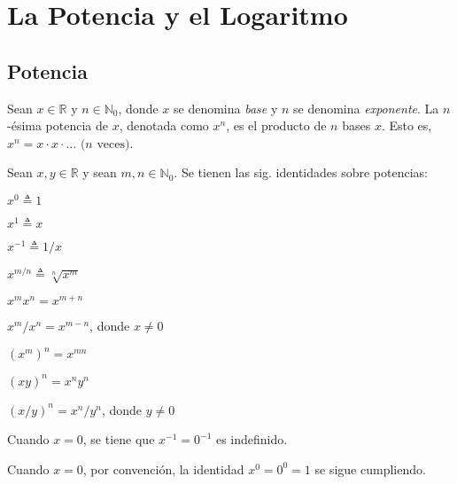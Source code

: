 \chapter{La Potencia y el Logaritmo}

\section{Potencia}

Sean $x\in\mathbb{R}$ y $n\in\mathbb{N}_{0}$, donde $x$ se denomina
\emph{base} y $n$ se denomina \emph{exponente}. La $n$-ésima potencia\emph{
}de $x$, denotada como $x^{n}$, es el producto de $n$ bases $x$.
Esto es, $x^{n}=x\cdot x\cdot\dots\text{ (}n\text{ veces)}$.

\begin{thm}
    \label{laws-of-exp}
    Sean $x,y\in\mathbb{R}$ y sean $m,n\in\mathbb{N}_{0}$.
    Se tienen las sig. identidades sobre potencias:
    \begin{enumerate}
    \begin{multicols}{2}
        \item $x^{0}\triangleq1$
        \item $x^{1}\triangleq x$
        \item $x^{-1}\triangleq1/x$
        \item $x^{m/n}\triangleq\sqrt[n]{x^{m}}$
        \item $x^{m}x^{n}=x^{m+n}$
        \item $x^{m}/x^{n}=x^{m-n}$, donde $x\neq0$
        \item $(x^{m})^{n}=x^{mn}$
        \item $(xy)^{n}=x^{n}y^{n}$
        \item $(x/y)^{n}=x^{n}/y^{n}$, donde $y\neq0$
    \end{multicols}
    \end{enumerate}
\end{thm}

\begin{rem}
    Cuando $x=0$, se tiene que $x^{-1}=0^{-1}$ es indefinido.
\end{rem}

\begin{rem}
    Cuando $x=0$, por convención, la identidad $x^{0}=0^0=1$ se sigue
    cumpliendo.
\end{rem}

